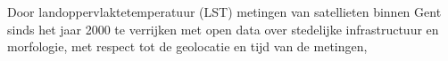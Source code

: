 
%
%
%
%
%

%



\chapter*{}

Door landoppervlaktetemperatuur (LST) metingen van satellieten binnen Gent sinds het jaar 2000 te verrijken met open data over stedelijke infrastructuur en morfologie, 
met respect tot de geolocatie en tijd van de metingen, 
